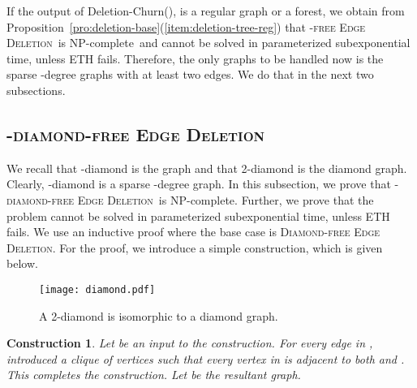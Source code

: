 \documentclass[envcountsame,envcountsect,10pt,oribibl]{llncs}
\newcommand{\pname}[1]{\textnormal{\textsc{#1}}}
\newcommand{\cclass}[1]{\textnormal{\textsf{#1}}}
\newcommand{\HED}{\pname{-free Edge Deletion}}
\newcommand{\TDDED}{\pname{-diamond-free Edge Deletion}}
\newcommand{\DED}{\pname{Diamond-free Edge Deletion}}
\newcommand{\NPC}{\cclass{NP-complete}}
\newtheorem{construction}{Construction}
\begin{document}
If the output of Deletion-Churn(),  is a regular graph or a forest,
we obtain from Proposition~\ref{pro:deletion-base}(\ref{item:deletion-tree-reg}) that
\HED\ is \NPC\ and cannot be solved in parameterized subexponential
time, unless ETH fails.
Therefore, the only graphs to be handled now is the sparse -degree graphs with 
at least two edges. We do that in the next two subsections.
\subsection{\TDDED}
\label{sec:tdiamond}

We recall that -diamond is the graph  and that 
2-diamond is the diamond graph. Clearly, -diamond is a sparse -degree graph.
In this subsection, we prove that \TDDED\ is \NPC. Further, we 
prove that the problem cannot be solved in parameterized subexponential time,
unless ETH fails. We use an inductive proof where the base case is \DED.
For the proof, we introduce a simple construction, which is 
given below.


\begin{figure}[h]
  \centering
  \texttt{[image: diamond.pdf]}
  \caption{A 2-diamond is isomorphic to a diamond graph.}
  \label{fig:diamond}
\end{figure}


\begin{construction}
  \label{con:diamond}
  Let  be an input to the construction.
  For every edge  in , introduced a clique  of 
  vertices such that every vertex in  is adjacent to both  and .
  This completes the construction. Let  be the resultant graph.
\end{construction}
\end{document}
